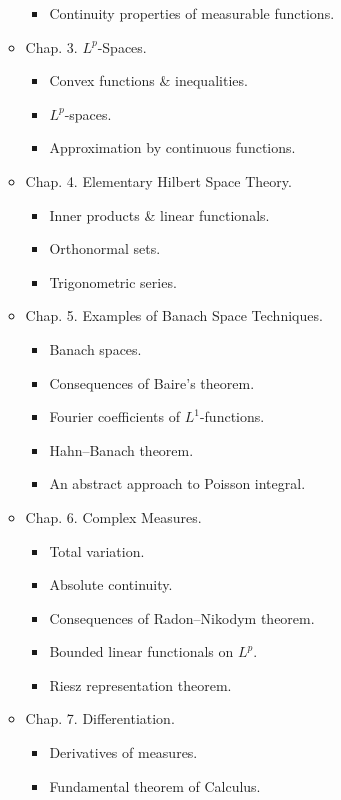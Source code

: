 \documentclass{article}
\begin{document}
\begin{itemize}
\begin{itemize}
\begin{itemize}
			\item {\sf Continuity properties of measurable functions.}
		\end{itemize}
		\item {\sf Chap. 3. $L^p$-Spaces.}
		\begin{itemize}
			\item {\sf Convex functions \& inequalities.}
			\item {\sf$L^p$-spaces.}
			\item {\sf Approximation by continuous functions.}
		\end{itemize}
		\item {\sf Chap. 4. Elementary Hilbert Space Theory.}
		\begin{itemize}
			\item {\sf Inner products \& linear functionals.}
			\item {\sf Orthonormal sets.}
			\item {\sf Trigonometric series.}
		\end{itemize}
		\item {\sf Chap. 5. Examples of Banach Space Techniques.}
		\begin{itemize}
			\item {\sf Banach spaces.}
			\item {\sf Consequences of Baire's theorem.}
			\item {\sf Fourier coefficients of $L^1$-functions.}
			\item {\sf Hahn--Banach theorem.}
			\item {\sf An abstract approach to Poisson integral.}
		\end{itemize}
		\item {\sf Chap. 6. Complex Measures.}
		\begin{itemize}
			\item {\sf Total variation.}
			\item {\sf Absolute continuity.}
			\item {\sf Consequences of Radon--Nikodym theorem.}
			\item {\sf Bounded linear functionals on $L^p$.}
			\item {\sf Riesz representation theorem.}
		\end{itemize}
		\item {\sf Chap. 7. Differentiation.}
		\begin{itemize}
			\item {\sf Derivatives of measures.}
			\item {\sf Fundamental theorem of Calculus.}

\end{itemize}
\end{itemize}
\end{itemize}
\end{document}
